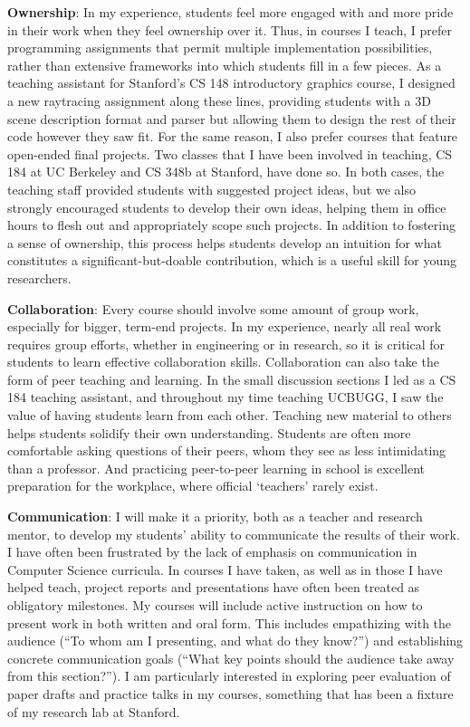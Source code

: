 \documentclass[
10pt, %
a4paper, %
oneside, %
headinclude,footinclude, %
BCOR5mm, %
]{scrartcl}
\begin{document}
\textbf{Ownership}:
In my experience, students feel more engaged with and more pride in their work when they feel ownership over it. Thus, in courses I teach, I prefer programming assignments that permit multiple implementation possibilities, rather than extensive frameworks into which students fill in a few pieces. As a teaching assistant for Stanford's CS 148 introductory graphics course, I designed a new raytracing assignment along these lines, providing students with a 3D scene description format and parser but allowing them to design the rest of their code however they saw fit. For the same reason, I also prefer courses that feature open-ended final projects. Two classes that I have been involved in teaching, CS 184 at UC Berkeley and CS 348b at Stanford, have done so. In both cases, the teaching staff provided students with suggested project ideas, but we also strongly encouraged students to develop their own ideas, helping them in office hours to flesh out and appropriately scope such projects. In addition to fostering a sense of ownership, this process helps students develop an intuition for what constitutes a significant-but-doable contribution, which is a useful skill for young researchers.

\textbf{Collaboration}:
Every course should involve some amount of group work, especially for bigger, term-end projects. In my experience, nearly all real work requires group efforts, whether in engineering or in research, so it is critical for students to learn effective collaboration skills. Collaboration can also take the form of peer teaching and learning. In the small discussion sections I led as a CS 184 teaching assistant, and throughout my time teaching UCBUGG, I saw the value of having students learn from each other. Teaching new material to others helps students solidify their own understanding. Students are often more comfortable asking questions of their peers, whom they see as less intimidating than a professor. And practicing peer-to-peer learning in school is excellent preparation for the workplace, where official `teachers' rarely exist.

\textbf{Communication}:
I will make it a priority, both as a teacher and research mentor, to develop my students' ability to communicate the results of their work. I have often been frustrated by the lack of emphasis on communication in Computer Science curricula. In courses I have taken, as well as in those I have helped teach, project reports and presentations have often been treated as obligatory milestones. My courses will include active instruction on how to present work in both written and oral form. This includes empathizing with the audience (``To whom am I presenting, and what do they know?'') and establishing concrete communication goals (``What key points should the audience take away from this section?''). I am particularly interested in exploring peer evaluation of paper drafts and practice talks in my courses, something that has been a fixture of my research lab at Stanford. 
\end{document}
